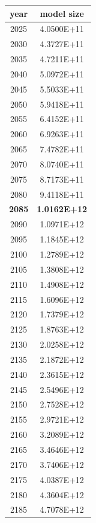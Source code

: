 \documentclass[a4paper]{article}
\begin{document}
    \pagebreak
    
    \small
    
    \begin{tabular}{| c | c |}
    	\hline
    	year & model size \\\hline
    	2025 & 4.0500E+11 \\\hline
    	2030 & 4.3727E+11 \\\hline
    	2035 & 4.7211E+11 \\\hline
    	2040 & 5.0972E+11 \\\hline
    	2045 & 5.5033E+11 \\\hline
    	2050 & 5.9418E+11 \\\hline
    	2055 & 6.4152E+11 \\\hline
    	2060 & 6.9263E+11 \\\hline
    	2065 & 7.4782E+11 \\\hline
    	2070 & 8.0740E+11 \\\hline
    	2075 & 8.7173E+11 \\\hline
    	2080 & 9.4118E+11 \\\hline
    	\textbf{2085} & \textbf{1.0162E+12} \\\hline
    	2090 & 1.0971E+12 \\\hline
    	2095 & 1.1845E+12 \\\hline
    	2100 & 1.2789E+12 \\\hline
    	2105 & 1.3808E+12 \\\hline
    	2110 & 1.4908E+12 \\\hline
    	2115 & 1.6096E+12 \\\hline
    	2120 & 1.7379E+12 \\\hline
    	2125 & 1.8763E+12 \\\hline
    	2130 & 2.0258E+12 \\\hline
    	2135 & 2.1872E+12 \\\hline
    	2140 & 2.3615E+12 \\\hline
    	2145 & 2.5496E+12 \\\hline
    	2150 & 2.7528E+12 \\\hline
    	2155 & 2.9721E+12 \\\hline
    	2160 & 3.2089E+12 \\\hline
    	2165 & 3.4646E+12 \\\hline
    	2170 & 3.7406E+12 \\\hline
    	2175 & 4.0387E+12 \\\hline
    	2180 & 4.3604E+12 \\\hline
    	2185 & 4.7078E+12 \\\hline

\end{tabular}
\end{document}
